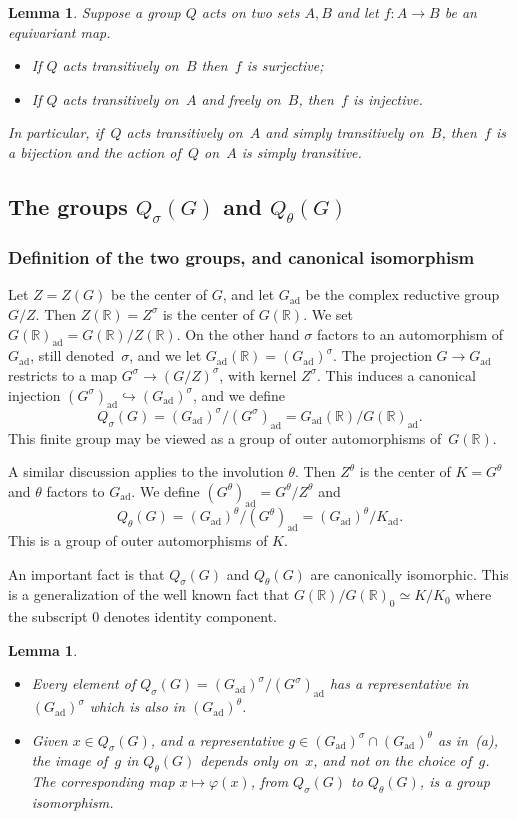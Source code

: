 \documentclass[10pt,leqno]{article}
\newtheorem{lemma}[equation]{Lemma}
\newcommand{\ad}{\mathrm{ad}}
\newcommand{\Gad}{G_\mathrm{ad}}
\newcommand{\Kad}{K_\mathrm{ad}}
\newcommand{\R}{\mathbb R}
\newcommand{\G}{G}
\begin{document}
\begin{lemma} Suppose a group $Q$ acts on two sets $A, B$ and let $f\colon A \to B$ be an equivariant map. 
\begin{itemize}
\item[(a)] If $Q$ acts transitively on~$B$  then~$f$ is surjective;
\item[(b)] If $Q$ acts transitively on~$A$ and freely on~$B$, then~$f$ is injective.
\end{itemize}
In particular, if~$Q$ acts transitively on~$A$ and simply transitively on~$B$, then~$f$ is a bijection and the action of~$Q$ on~$A$ is simply transitive.
\end{lemma}

\subsection{The groups $Q_\sigma(G)$ and $Q_{\theta}(G)$}

\subsubsection{Definition of the two groups, and canonical isomorphism}

Let $Z=Z(G)$ be the center of $G$, and let $\Gad$ be the complex reductive group~$G/Z$.
Then $Z(\R)=Z^\sigma$ is the center of $G(\R)$. We set $\G(\R)_\ad=G(\R)/Z(\R)$.
On the other hand  $\sigma$ factors to an automorphism  of $\Gad$, still denoted~$\sigma$, and we let  $\Gad(\R)=(\Gad)^\sigma$.
The projection $G\rightarrow \Gad$ restricts to a map $G^\sigma\rightarrow (G/Z)^\sigma$, with kernel $Z^\sigma$.
This induces a canonical injection $(G^\sigma)_\ad\hookrightarrow (\Gad)^\sigma$, and we define
$$
Q_\sigma(G)=(\Gad)^\sigma/(G^\sigma)_\ad=\Gad(\R)/\G(\R)_\ad.
$$
This finite group may be viewed as a group of outer automorphisms of~$G(\R)$.

A similar discussion applies to the involution $\theta$.
Then $Z^\theta$ is the center of $K=G^\theta$ and  $\theta$ factors to $\Gad$.
We define $(G^\theta)_\ad=G^\theta/Z^\theta$ and
$$
Q_\theta(G)=(\Gad)^\theta/(G^\theta)_\ad =(\Gad)^\theta/\Kad.
$$
This is a group of outer automorphisms of $K$. 

An important fact is that $Q_\sigma(G)$ and $Q_\theta(G)$ are canonically isomorphic. This is a generalization of the well known fact that
$G(\R)/G(\R)_0\simeq K/K_0$ where the subscript $0$ denotes identity component. 

\begin{lemma}\label{lem:iso_q}
\begin{itemize}
\item[(a)] 
Every element of $Q_\sigma(G)=(\Gad)^\sigma/(G^\sigma)_\ad$ has a representative in $(\Gad)^\sigma$ which is also in $(\Gad)^\theta$.
\item[(b)] Given $x \in Q_{\sigma}(G)$, and a representative $g\in (\Gad)^\sigma \cap (\Gad)^\theta$ as in~(a), the image of~$g$ in  $Q_\theta(G)$ depends only on~$x$, and not on  the choice of~$g$. The corresponding map $x \mapsto \varphi(x)$, from $Q_{\sigma}(G)$ to $Q_{\theta}(G)$, is a group isomorphism. 
\end{itemize}
\end{lemma}
\end{document}
